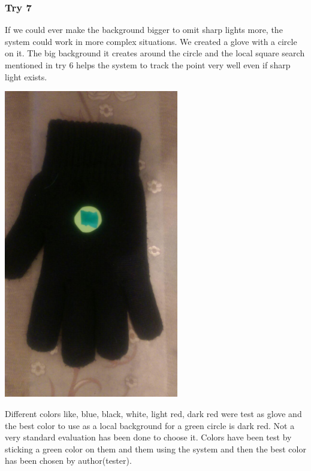 \documentclass{report}
\begin{document}
\subsubsection{Try 7}
If we could ever make the background bigger to omit sharp lights more, the system could work in more complex situations. We created a glove with a circle on it. The big background it creates around the circle and the local square search mentioned in try 6 helps the system to track the point very well even if sharp light exists. 
\begin{center}
	\includegraphics[width=3in]{Object7.jpg}
\end{center}
 Different colors like, blue, black, white, light red, dark red were test as glove and the best color to use as a local background for a green circle is dark red. Not a very standard evaluation has been done to choose it. Colors have been test by sticking a green color on them and them using the system and then the best color has been chosen by author(tester). 
\end{document}
